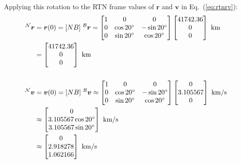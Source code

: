 \documentclass[titlepage]{article}
\begin{document}
Applying this rotation to the RTN frame values of $\boldsymbol{r}$ and $\boldsymbol{v}$ in Eq.~(\ref{eq:rtnrv}):
\begin{equation}
	\begin{split}
		\prescript{\mathcal{N}}{}{\boldsymbol{r}}&=\boldsymbol{r}(0)=[NB]\,\prescript{\mathcal{B}}{}{\boldsymbol{r}}=
		\begin{bmatrix}
			1 & 0 & 0 \\
			0 & \cos 20^\circ & -\sin 20^\circ \\
			0 & \sin 20^\circ & \cos 20^\circ
		\end{bmatrix}
		\begin{bmatrix}
			41742.36 \\
			0 \\
			0
		\end{bmatrix}\text{ km} \\
		&=
		\begin{bmatrix}
			41742.36 \\
			0 \\
			0
		\end{bmatrix}\text{ km} \\
		\\
		\prescript{\mathcal{N}}{}{\boldsymbol{v}}&=\boldsymbol{v}(0)=[NB]\,\prescript{\mathcal{B}}{}{\boldsymbol{v}}\approx
		\begin{bmatrix}
			1 & 0 & 0 \\
			0 & \cos 20^\circ & -\sin 20^\circ \\
			0 & \sin 20^\circ & \cos 20^\circ
		\end{bmatrix}
		\begin{bmatrix}
			0 \\
			3.105567 \\
			0
		\end{bmatrix}\text{ km/s} \\
		&\approx
		\begin{bmatrix}
			0 \\
			3.105567\cos 20^\circ \\
			3.105567\sin 20^\circ
		\end{bmatrix}\text{ km/s} \\
		&\approx
		\begin{bmatrix}
			0 \\
			2.918278 \\
			1.062166
		\end{bmatrix}\text{ km/s}
	\end{split}
\end{equation}
\end{document}
